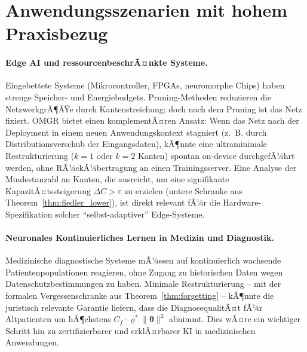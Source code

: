 ﻿\documentclass[12pt, a4paper, openany]{report}
\newcommand{\eps}{\varepsilon}
\begin{document}
\section{Anwendungsszenarien mit hohem Praxisbezug}
\label{sec:outlook_applications}

\paragraph{Edge AI und ressourcenbeschrÃ¤nkte Systeme.}
Eingebettete Systeme (Mikrocontroller, FPGAs, neuromorphe Chips) haben
strenge Speicher- und Energiebudgets.  Pruning-Methoden reduzieren die
NetzwerkgrÃ¶ÃŸe durch Kantenstreichung; doch nach dem Pruning ist das Netz
fixiert.  OMGR bietet einen komplementÃ¤ren Ansatz: Wenn das Netz nach der
Deployment in einem neuen Anwendungskontext stagniert (z.~B. durch
Distributionsverschub der Eingangsdaten), kÃ¶nnte eine ultraminimale
Restrukturierung ($k = 1$ oder $k = 2$ Kanten) spontan on-device durchgefÃ¼hrt
werden, ohne RÃ¼ckÃ¼bertragung an einen Trainingsserver.  Eine Analyse der
Mindestanzahl an Kanten, die ausreicht, um eine signifikante
KapazitÃ¤tssteigerung $\Delta C > \eps$ zu erzielen (untere Schranke aus
Theorem~\ref{thm:fiedler_lower}), ist direkt relevant fÃ¼r die
Hardware-Spezifikation solcher ``selbst-adaptiver'' Edge-Systeme.

\paragraph{Neuronales Kontinuierliches Lernen in Medizin und Diagnostik.}
Medizinische diagnostische Systeme mÃ¼ssen auf kontinuierlich wachsende
Patientenpopulationen reagieren, ohne Zugang zu historischen Daten wegen
Datenschutzbestimmungen zu haben.  Minimale Restrukturierung -- mit der
formalen Vergessenschranke aus Theorem~\ref{thm:forgetting} -- kÃ¶nnte
die juristisch relevante Garantie liefern, dass die DiagnosequalitÃ¤t fÃ¼r
Altpatienten um hÃ¶chstens $C_f \cdot \varrho^* \|\bm{\theta}\|^2$ abnimmt.
Dies wÃ¤re ein wichtiger Schritt hin zu zertifizierbarer und erklÃ¤rbarer
KI in medizinischen Anwendungen.
\end{document}
